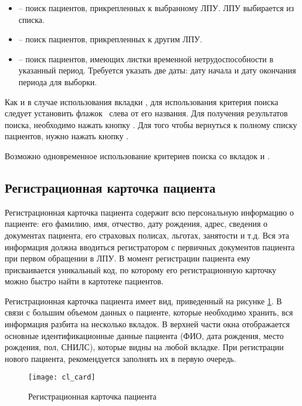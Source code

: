 \begin{itemize}
 \item	{} – поиск пациентов, прикрепленных к выбранному ЛПУ. ЛПУ выбирается из списка.
 \item {} – поиск пациентов, прикрепленных к другим ЛПУ.
 \item	{} – поиск пациентов, имеющих листки временной нетрудоспособности в указанный период. Требуется указать две даты: дату начала и дату окончания периода для выборки.
\end{itemize}

Как и в случае использования вкладки , для использования критерия поиска следует установить флажок \putx~слева от его названия. Для получения результатов поиска, необходимо нажать кнопку . Для того чтобы вернуться к полному списку пациентов, нужно нажать кнопку  .

Возможно одновременное использование критериев поиска со вкладок  и .

\subsection{Регистрационная карточка пациента} \label{cl_card}

Регистрационная карточка пациента содержит всю персональную информацию о пациенте: его фамилию, имя, отчество, дату рождения, адрес, сведения о документах пациента, его страховых полисах, льготах, занятости и т.д. Вся эта информация должна вводиться регистратором с первичных документов пациента при первом обращении в ЛПУ. В момент регистрации пациента ему присваивается уникальный код, по которому его регистрационную карточку можно быстро найти в картотеке пациентов.

Регистрационная карточка пациента имеет вид, приведенный на рисунке \ref{img_cl_card}. В связи с большим объемом данных о пациенте, которые необходимо хранить, вся информация разбита на несколько вкладок. В верхней части окна отображается основные идентификационные данные пациента (ФИО, дата рождения, место рождения, пол, СНИЛС), которые видны на любой вкладке. При регистрации нового пациента, рекомендуется заполнять их в первую очередь.

\begin{figure}[ht]\centering
 \texttt{[image: cl\_card]}
 \caption{Регистрационная карточка пациента}
 \label{img_cl_card}
\end{figure} 

